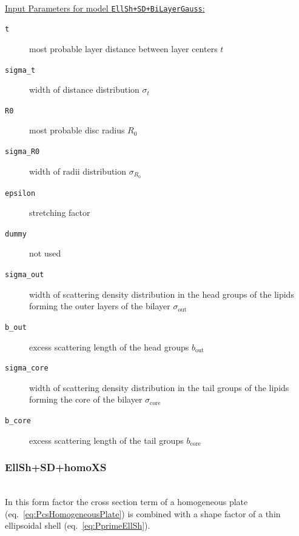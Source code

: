 \hspace{1pt}\\
\uline{Input Parameters for model \texttt{EllSh+SD+BiLayerGauss}:}\\
\begin{description}
\item[\texttt{t}] most probable layer distance between layer centers $t$
\item[\texttt{sigma\_t}] width of distance distribution $\sigma_t$
\item[\texttt{R0}] most probable disc radius $R_0$
\item[\texttt{sigma\_R0}] width of radii distribution $\sigma_{R_0}$
\item[\texttt{epsilon}] stretching factor
\item[\texttt{dummy}] not used
\item[\texttt{sigma\_out}] width of scattering density distribution in the head groups of the lipids forming the outer layers of the bilayer $\sigma_\mathrm{out}$
\item[\texttt{b\_out}] excess scattering length of the head groups $b_\mathrm{out}$
\item[\texttt{sigma\_core}] width of scattering density distribution in the tail groups of the lipids forming the core of the bilayer $\sigma_\mathrm{core}$
\item[\texttt{b\_core}] excess scattering length of the tail groups $b_\mathrm{core}$
\end{description}

\vspace{5mm}

\noindent
\subsubsection{EllSh+SD+homoXS} ~\\

\noindent
In this form factor the cross section term of a homogeneous plate (eq.\ \ref{eq:PcsHomogeneousPlate}) is combined with a shape factor of a thin ellipsoidal shell (eq.\ \ref{eq:PprimeEllSh}).

\vspace{5mm}


